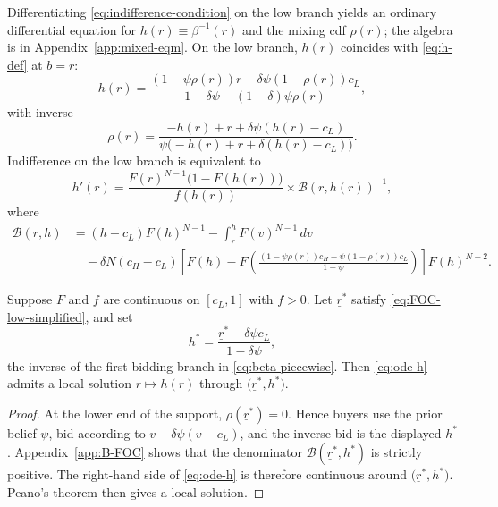 Differentiating \eqref{eq:indifference-condition} on the low branch yields an
ordinary differential equation for $h(r)\equiv\beta^{-1}(r)$ and the mixing cdf
$\rho(r)$; the algebra is in Appendix~\ref{app:mixed-eqm}.
On the low branch, $h(r)$ coincides with \eqref{eq:h-def} at $b=r$:
\begin{equation}
  h(r)
  = \frac{
      (1 - \psi \rho(r)) r
      - \delta \psi (1 - \rho(r)) c_L
    }{
      1 - \delta \psi - (1 - \delta) \psi \rho(r)
    },
  \label{eq:h-from-rho}
\end{equation}
with inverse
\begin{equation}
  \rho(r)
  = \frac{
      -h(r) + r + \delta \psi (h(r) - c_L)
    }{
      \psi\bigl(-h(r) + r + \delta (h(r) - c_L)\bigr)
    }.
  \label{eq:rho-from-h}
\end{equation}
Indifference on the low branch is equivalent to
\begin{equation}
  h'(r)
  = \frac{F(r)^{N-1}\bigl(1 - F(h(r))\bigr)}{f(h(r))}
    \times \mathcal{B}(r,h(r))^{-1},
  \label{eq:ode-h}
\end{equation}
where
\begin{equation}
  \begin{aligned}
  \mathcal{B}(r,h)
  &= (h - c_L) F(h)^{N-1}
    - \int_{r}^{h} F(v)^{N-1}\, dv \\
  &\quad - \delta N (c_H - c_L)
    \left[
      F(h)
      - F\!\left(
        \frac{
          (1-\psi\rho(r))c_H-\psi(1-\rho(r))c_L
        }{1-\psi}
      \right)
    \right]
    F(h)^{N-2}.
  \end{aligned}
  \label{eq:B-bracket}
\end{equation}

\begin{claim}
  \label{claim:ode-existence}
  Suppose $F$ and $f$ are continuous on $[c_L,1]$ with $f>0$.
  Let $\underline{r}^{*}$ satisfy \eqref{eq:FOC-low-simplified}, and set
  \[
    h^{*}
    = \frac{\underline{r}^{*}-\delta\psi c_L}{1-\delta\psi},
  \]
  the inverse of the first bidding branch in \eqref{eq:beta-piecewise}.
  Then \eqref{eq:ode-h} admits a local solution
  $r\mapsto h(r)$ through $\bigl(\underline{r}^{*},h^{*}\bigr)$.
\end{claim}

\begin{proof}
At the lower end of the support, $\rho(\underline{r}^{*})=0$.
Hence buyers use the prior belief $\psi$, bid according to
$v-\delta\psi(v-c_L)$, and the inverse bid is the displayed $h^{*}$.
Appendix~\ref{app:B-FOC} shows that the denominator
$\mathcal{B}(\underline{r}^{*},h^{*})$ is strictly positive.
The right-hand side of \eqref{eq:ode-h} is therefore continuous around
$\bigl(\underline{r}^{*},h^{*}\bigr)$.
Peano's theorem then gives a local solution.
\end{proof}

